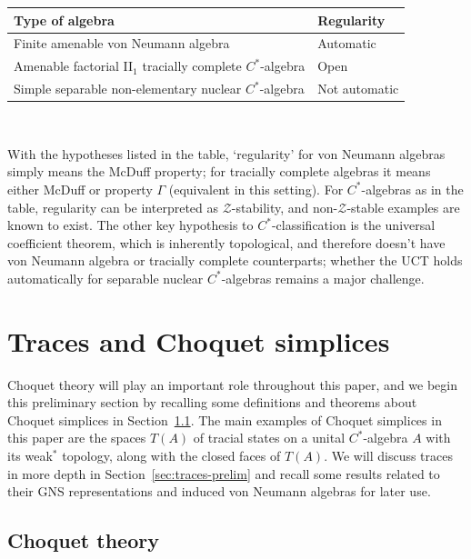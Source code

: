 \documentclass[a4paper,11pt]{amsart}
\theoremstyle{definition}
\numberwithin{equation}{section}
\numberwithin{theorem}{section}
\newcommand{\Z}{\mathcal Z}
\begin{document}
\begin{center}
\begin{tabular}{ll}\toprule
    Type of algebra & Regularity\\ \midrule
    Finite amenable von Neumann algebra & Automatic\\
    Amenable factorial II$_1$ tracially complete $C^*$-algebra & Open\\
    Simple separable non-elementary nuclear $C^*$-algebra & Not automatic\\ \bottomrule
\end{tabular}
\end{center}

\

With the hypotheses listed in the table, `regularity' for von Neumann algebras simply means the McDuff property; for tracially complete algebras it means either McDuff or property $\Gamma$ (equivalent in this setting).  For $C^*$-algebras as in the table, regularity can be interpreted as $\mathcal Z$-stability, and non-$\Z$-stable examples are known to exist.
The other key hypothesis to $C^*$-classification is the universal coefficient theorem, which is inherently topological, and therefore doesn't have von Neumann algebra or tracially complete counterparts; whether the UCT holds automatically for separable nuclear $C^*$-algebras remains a major challenge.



\section{Traces and Choquet simplices}\label{sec:prelim}

Choquet theory will play an important role throughout this paper, and we begin this preliminary section by recalling some definitions and theorems about Choquet simplices in Section~\ref{sec:simplices}.  The main examples of Choquet simplices in this paper are the spaces $T(A)$ of tracial states on a unital $C^*$-algebra $A$ with its weak$^*$ topology, along with the closed faces of $T(A)$.  We will discuss traces in more depth in Section~\ref{sec:traces-prelim} and recall some results related to their GNS representations and induced von Neumann algebras for later use.

\subsection{Choquet theory}\label{sec:simplices}  
\end{document}
